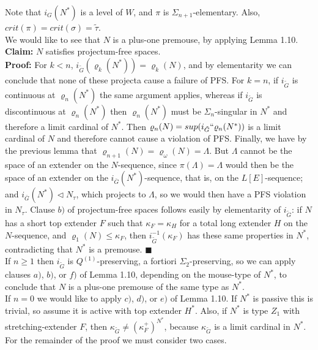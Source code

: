 \documentclass[12pt]{article}
\begin{document}
 \smallskip
 
Note that $i_{G}(N^* )$ is a level of $W$, and $\pi$ is $\Sigma_{n+1}$-elementary.  Also, $crit (\pi ) = crit (\sigma ) = \tilde{\tau }$. \\

We would like to see that $N$ is a plus-one premouse, by applying Lemma 1.10.\\

\textbf{Claim:} $N$ satisfies projectum-free spaces.\\


\textbf{Proof:}  For $k < n$, $i_{\tilde{G}} (\varrho_k (N^*)) = \varrho_k (N)$, and by elementarity we can conclude that none of these projecta cause a failure of PFS.  For $k = n$, if $i_{\tilde{G}}$ is continuous at $\varrho_n(N^*)$ the same argument applies, whereas if $i_{\tilde{G}}$ is discontinuous at $\varrho_n(N^*)$ then $\varrho_n (N^*)$ must be $\Sigma_n$-singular in $N^*$ and therefore a limit cardinal of $N^*$.  Then $\varrho_n (N) = sup ( i_{\tilde{G}} `` \varrho_n (N^*))$ is a limit cardinal of $N$ and therefore cannot cause a violation of PFS.  Finally, we have by the previous lemma that $\varrho_{n+1}(N) = \varrho_\omega (N) = \Lambda$.  But $\Lambda$ cannot be the space of an extender on the $N$-sequence, since $\pi ( \Lambda ) = \Lambda$ would then be the space of an extender on the $i_{\bar{G}} ( N^* )$-sequence, that is, on the $L[E]$-sequence; and $i_{\bar{G}} ( N^* ) \lhd N_\tau$, which projects to $\Lambda$, so we would then have a PFS violation in $N_\tau$.  Clause $b)$ of projectum-free spaces follows easily by elementarity of $i_{\tilde{G}}$: if $N$ has a short top extender $F$ such that $\kappa_F = \kappa_H$ for a total long extender $H$ on the $N$-sequence, and $\varrho_1 (N) \leq \kappa_F$, then $i_{\tilde{G}}^{-1} (\kappa_F )$ has these same properties in $N^*$, contradicting that $N^*$ is a premouse.  $\blacksquare$\\



 If $n \geq 1$ then $i_{\tilde{G}}$ is $Q^{(1)}$-preserving, a fortiori $\Sigma_2$-preserving, so we can apply clauses $a)$, $b)$, or $f)$ of Lemma 1.10, depending on the mouse-type of $N^*$, to conclude that $N$ is a plus-one premouse of the same type as $N^*$.\\

If $n = 0$ we would like to apply $c)$, $d)$, or $e)$ of Lemma 1.10.  If $N^*$ is passive this is trivial, so assume it is active with top extender $H^*$.  Also, if $N^*$ is type $Z_1$ with stretching-extender $F$, then $\kappa_{\tilde{G}} \neq (\kappa_F^+ )^{N^* }$, because $\kappa_{\tilde{G}}$ is a limit cardinal in $N^*$.  For the remainder of the proof we must consider two cases.\\
\end{document}
